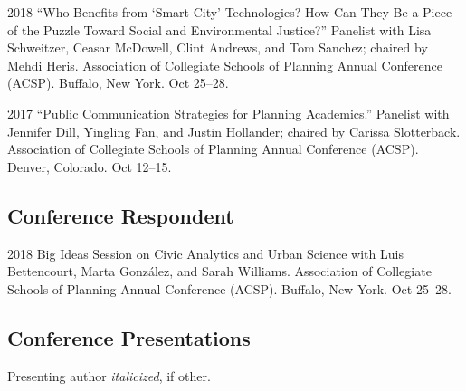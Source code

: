 \documentclass[12pt,letterpaper]{report}
\begin{document}
\begin{tablist}
	
\item[2018] \tab \enquote{Who Benefits from \enquote{Smart City} Technologies? How Can They Be a Piece of the Puzzle Toward Social and Environmental Justice?} Panelist with Lisa Schweitzer, Ceasar McDowell, Clint Andrews, and Tom Sanchez; chaired by Mehdi Heris. Association of Collegiate Schools of Planning Annual Conference (ACSP). Buffalo, New York. Oct 25--28.

\item[2017] \tab \enquote{Public Communication Strategies for Planning Academics.} Panelist with Jennifer Dill, Yingling Fan, and Justin Hollander; chaired by Carissa Slotterback. Association of Collegiate Schools of Planning Annual Conference (ACSP). Denver, Colorado. Oct 12--15.

\end{tablist}

\subsection*{Conference Respondent}

\begin{tablist}
	
\item[2018] \tab Big Ideas Session on Civic Analytics and Urban Science with Luis Bettencourt, Marta González, and Sarah Williams. Association of Collegiate Schools of Planning Annual Conference (ACSP). Buffalo, New York. Oct 25--28.
	
\end{tablist}

\subsection*{Conference Presentations}

Presenting author \textit{italicized}, if other.\bigskip
\end{document}
